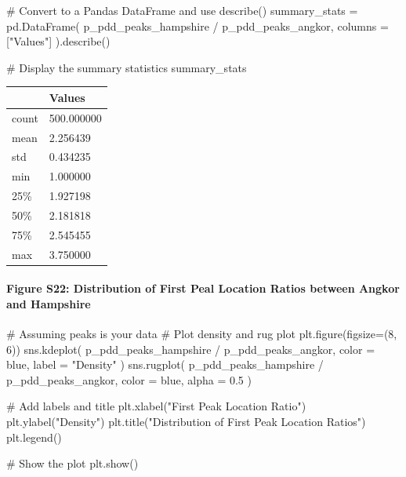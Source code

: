 \documentclass[
  11pt,
  letterpaper,
  DIV=11,
  numbers=noendperiod]{scrartcl}
\let\oldparagraph\paragraph
\renewcommand{\paragraph}[1]{\oldparagraph{#1}\mbox{}}
\newenvironment{Shaded}{\begin{snugshade}}{\end{snugshade}}
\newcommand{\CommentTok}[1]{\textcolor[rgb]{0.37,0.37,0.37}{#1}}
\newcommand{\DecValTok}[1]{\textcolor[rgb]{0.68,0.00,0.00}{#1}}
\newcommand{\FloatTok}[1]{\textcolor[rgb]{0.68,0.00,0.00}{#1}}
\newcommand{\NormalTok}[1]{\textcolor[rgb]{0.00,0.23,0.31}{#1}}
\newcommand{\OperatorTok}[1]{\textcolor[rgb]{0.37,0.37,0.37}{#1}}
\newcommand{\StringTok}[1]{\textcolor[rgb]{0.13,0.47,0.30}{#1}}
\begin{document}
\begin{Shaded}
\begin{Highlighting}[]
\CommentTok{\# Convert to a Pandas DataFrame and use describe()}
\NormalTok{summary\_stats }\OperatorTok{=}\NormalTok{ pd.DataFrame(}
\NormalTok{    p\_pdd\_peaks\_hampshire }\OperatorTok{/}\NormalTok{ p\_pdd\_peaks\_angkor, }
\NormalTok{    columns }\OperatorTok{=}\NormalTok{ [}\StringTok{"Values"}\NormalTok{]}
\NormalTok{).describe()}

\CommentTok{\# Display the summary statistics}
\NormalTok{summary\_stats}
\end{Highlighting}
\end{Shaded}

\begin{longtable}[]{@{}ll@{}}
\toprule\noalign{}
& Values \\
\midrule\noalign{}
\endhead
\bottomrule\noalign{}
\endlastfoot
count & 500.000000 \\
mean & 2.256439 \\
std & 0.434235 \\
min & 1.000000 \\
25\% & 1.927198 \\
50\% & 2.181818 \\
75\% & 2.545455 \\
max & 3.750000 \\
\end{longtable}

\paragraph{Figure S22: Distribution of First Peal Location Ratios
between Angkor and
Hampshire}\label{figure-s22-distribution-of-first-peal-location-ratios-between-angkor-and-hampshire}

\begin{Shaded}
\begin{Highlighting}[]
\CommentTok{\# Assuming \textasciigrave{}peaks\textasciigrave{} is your data}
\CommentTok{\# Plot density and rug plot}
\NormalTok{plt.figure(figsize}\OperatorTok{=}\NormalTok{(}\DecValTok{8}\NormalTok{, }\DecValTok{6}\NormalTok{))}
\NormalTok{sns.kdeplot(}
\NormalTok{    p\_pdd\_peaks\_hampshire }\OperatorTok{/}\NormalTok{ p\_pdd\_peaks\_angkor, }
\NormalTok{    color }\OperatorTok{=} \StringTok{\textquotesingle{}blue\textquotesingle{}}\NormalTok{, }
\NormalTok{    label }\OperatorTok{=} \StringTok{"Density"}
\NormalTok{)}
\NormalTok{sns.rugplot(}
\NormalTok{    p\_pdd\_peaks\_hampshire }\OperatorTok{/}\NormalTok{ p\_pdd\_peaks\_angkor, }
\NormalTok{    color }\OperatorTok{=} \StringTok{\textquotesingle{}blue\textquotesingle{}}\NormalTok{, }
\NormalTok{    alpha }\OperatorTok{=} \FloatTok{0.5}
\NormalTok{)}

\CommentTok{\# Add labels and title}
\NormalTok{plt.xlabel(}\StringTok{"First Peak Location Ratio"}\NormalTok{)}
\NormalTok{plt.ylabel(}\StringTok{"Density"}\NormalTok{)}
\NormalTok{plt.title(}\StringTok{"Distribution of First Peak Location Ratios"}\NormalTok{)}
\NormalTok{plt.legend()}

\CommentTok{\# Show the plot}
\NormalTok{plt.show()}
\end{Highlighting}
\end{Shaded}
\end{document}
